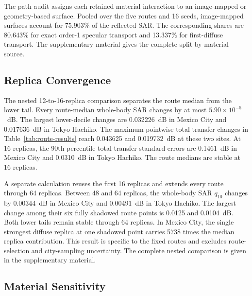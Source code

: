 \documentclass{ieeeaccess}
\begin{document}
The path audit assigns each retained material interaction to an image-mapped or
geometry-based surface. Pooled over the five routes and 16 seeds, image-mapped
surfaces account for 75.903\% of the reflected SAR. The
corresponding shares are 80.643\% for exact order-1 specular transport and
13.337\% for first-diffuse transport. The supplementary material gives the
complete split by material source.

\subsection{Replica Convergence}
\label{sec:convergence}

The nested 12-to-16-replica comparison separates the route median from the
lower tail. Every route-median whole-body SAR changes by at most
$5.90\times10^{-5}$~dB. The largest lower-decile changes are 0.032226~dB in
Mexico City and 0.017636~dB in Tokyo Hachiko. The maximum pointwise
total-transfer changes in Table~\ref{tab:route-results} reach 0.043625 and
0.019732~dB at these two sites. At 16 replicas, the 90th-percentile total-transfer standard errors are
0.1461~dB in Mexico City and 0.0310~dB in Tokyo Hachiko. The route medians are
stable at 16 replicas.

A separate calculation reuses the first 16 replicas and extends every route
through 64 replicas. Between 48 and 64 replicas, the whole-body SAR
$q_{10}$ changes by 0.00344~dB in Mexico City and 0.00491~dB in Tokyo Hachiko.
The largest change among their six fully shadowed route points is 0.0125 and
0.0104~dB. Both lower tails remain stable through 64 replicas.
In Mexico City, the single strongest diffuse replica at one shadowed point
carries 5738 times the median replica contribution.
This result is specific to the fixed routes and excludes route-selection and
city-sampling uncertainty. The complete nested comparison is given in the
supplementary material.

\subsection{Material Sensitivity}
\label{sec:material-sensitivity}
\end{document}
